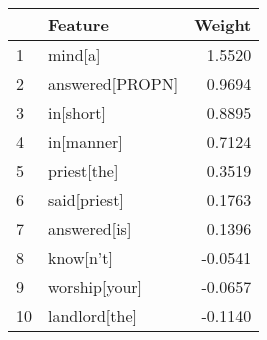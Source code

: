 \begin{tabular}{llr}
\toprule
{} &          Feature &  Weight \\
\midrule
1  &          mind[a] &  1.5520 \\
2  &  answered[PROPN] &  0.9694 \\
3  &        in[short] &  0.8895 \\
4  &       in[manner] &  0.7124 \\
5  &      priest[the] &  0.3519 \\
6  &     said[priest] &  0.1763 \\
7  &     answered[is] &  0.1396 \\
8  &        know[n't] & -0.0541 \\
9  &    worship[your] & -0.0657 \\
10 &    landlord[the] & -0.1140 \\
\bottomrule
\end{tabular}
